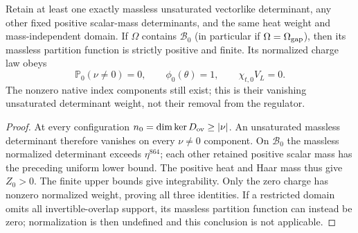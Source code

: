 \documentclass[12pt,a4paper]{article}
\begin{document}
\begin{theorem}
\label{p10:thm:v2189-massless-topological-endpoint}
Retain at least one exactly massless unsaturated vectorlike determinant,
any other fixed positive scalar-mass determinants, and the same heat
weight and mass-independent domain. If $\Omega$ contains $\mathcal B_0$
(in particular if $\Omega=\Omega_{\rm gap}$), then its massless partition
function is strictly positive and finite. Its normalized charge law obeys
\[
 \mathbb P_0(\nu\ne0)=0,\qquad
 \phi_0(\theta)=1,\qquad \chi_{t,0}V_L=0.
\]
The nonzero native index components still exist; this is their vanishing
unsaturated determinant weight, not their removal from the regulator.
\end{theorem}
\begin{proof}
At every configuration $n_0=\dim\ker D_{\rm ov}\ge|\nu|$.
An unsaturated massless determinant therefore vanishes on every
$\nu\ne0$ component. On $\mathcal B_0$ the massless normalized
determinant exceeds $\eta^{864}$; each other retained positive scalar
mass has the preceding uniform lower bound. The positive heat and Haar
mass thus give $Z_0>0$. The finite upper bounds give integrability.
Only the zero charge has nonzero normalized weight, proving all three
identities. If a restricted domain omits all invertible-overlap support,
its massless partition function can instead be zero; normalization is
then undefined and this conclusion is not applicable.
\end{proof}
\end{document}
